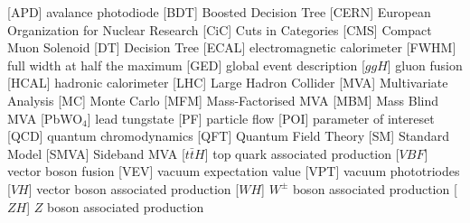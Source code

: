 \begin{acronym}[AAAAAA]
 [APD] {avalance photodiode}
 [BDT] {Boosted Decision Tree}
 [CERN] {European Organization for Nuclear Research}
 [CiC] {Cuts in Categories}
 [CMS] {Compact Muon Solenoid}
 [DT] {Decision Tree}
 [ECAL] {electromagnetic calorimeter}
 [FWHM] {full width at half the maximum}
 [GED] {global event description}
 [$ggH$] {gluon fusion}
 [HCAL] {hadronic calorimeter}
 [LHC] {Large Hadron Collider}
 [MVA] {Multivariate Analysis}
 [MC] {Monte Carlo}
 [MFM] {Mass-Factorised MVA}
 [MBM] {Mass Blind MVA}
 [PbWO$_{4}$] {lead tungstate}
 [PF] {particle flow}
 [POI] {parameter of intereset}
 [QCD] {quantum chromodynamics}
 [QFT] {Quantum Field Theory}
 [SM] {Standard Model}
 [SMVA] {Sideband MVA}
 [$t\bar{t}H$] {top quark associated production}
 [$VBF$] {vector boson fusion}
 [VEV] {vacuum expectation value}
 [VPT] {vacuum phototriodes}
 [$VH$] {vector boson associated production}
 [$WH$] {$W^{\pm}$ boson associated production}
 [$ZH$] {$Z$ boson associated production}
\end{acronym}



